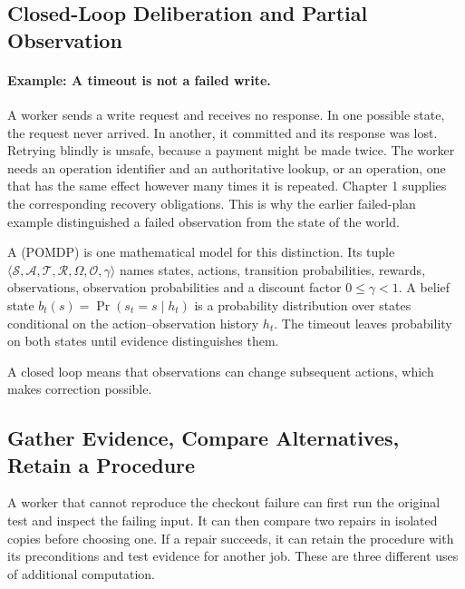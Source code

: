 \subsection{Closed-Loop Deliberation and Partial Observation}
\paragraph{Example: A timeout is not a failed write.}
A worker sends a write request and receives no response. In one possible state,
the request never arrived. In another, it committed and its response was lost.
Retrying blindly is unsafe, because a payment might be made twice. The worker
needs an operation identifier and an authoritative lookup, or an
 operation, one that has the same effect however many times
it is repeated. Chapter 1 supplies the corresponding recovery
obligations. This is why the earlier failed-plan example distinguished a failed
observation from the state of the world.


A  (POMDP) is one
mathematical model for this distinction. Its tuple
$\langle\mathcal S,\mathcal A,\mathcal T,\mathcal R,\Omega,\mathcal O,\gamma\rangle$
names states, actions, transition probabilities, rewards, observations,
observation probabilities and a discount factor $0\le\gamma<1$.
A belief state $b_t(s)=\Pr(s_t=s\mid h_t)$ is a probability distribution over
states conditional on the action--observation history $h_t$. The timeout
leaves probability on both states until evidence distinguishes them.

A closed loop means that observations can change subsequent actions, which
makes correction possible.


\subsection{Gather Evidence, Compare Alternatives, Retain a Procedure}
A worker that cannot reproduce the checkout failure can first run the original
test and inspect the failing input. It can then compare two repairs in isolated
copies before choosing one. If a repair succeeds, it can retain the procedure
with its preconditions and test evidence for another job. These are three
different uses of additional computation.

